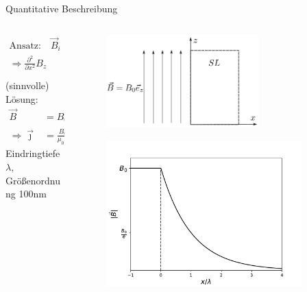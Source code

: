 \begin{frame}{Quantitative Beschreibung}

\begin{columns}
\begin{column}{0.49\textwidth}
\begin{align*}
    \text{Ansatz:} \quad \vec{B}_i &= (0, 0, B_z(x))^T \\
  \Rightarrow \frac{\partial ^2}{\partial x^2}B_z &= \frac{1}{\lambda ^2}B_z, \quad \lambda = \sqrt{\frac{m}{\mu_0 n q^2}}
\end{align*}
(sinnvolle) Lösung:
\begin{align*}
   \vec{B} &= B_0 \exp\left[-\frac{x}{\lambda}\right]\vec{e}_z \\
   \Rightarrow \vec{\jmath} &= \frac{B_0}{\mu_0 \lambda}\exp \left[-\frac{x}{\lambda} \right] \vec{e}_y
\end{align*}
Eindringtiefe $\lambda$, Größenordnung 100nm
\end{column}
\begin{column}{0.49\textwidth}
  \begin{figure}
    \centering
    \includegraphics[width = 0.7\textwidth]{bilder/supra_3.pdf}
    \label{fig: londongleichungen}
  \end{figure}
  \pause
  \begin{figure}
    \centering
    \includegraphics[width = 0.9\textwidth]{bilder/plot_london.pdf}
    \label{fig: plot_londongleichungen}
  \end{figure}
\end{column}
\end{columns}

\end{frame}

